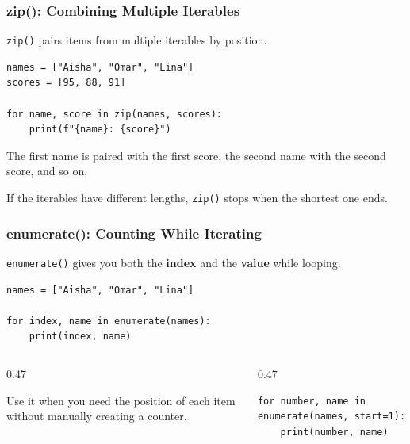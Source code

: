 \documentclass[aspectratio=169,10pt]{beamer}
\newcommand{\keyword}[1]{\textcolor{PrimaryBlue}{\textbf{#1}}}
\newcommand{\codeword}[1]{\texttt{#1}}
\begin{document}
\begin{frame}[fragile]
\frametitle{zip(): Combining Multiple Iterables}
\small
\codeword{zip()} pairs items from multiple iterables by position.

\vspace{0.18cm}
\begin{lstlisting}[style=pycode]
names = ["Aisha", "Omar", "Lina"]
scores = [95, 88, 91]

for name, score in zip(names, scores):
    print(f"{name}: {score}")
\end{lstlisting}

\begin{tcolorbox}[lecturebox,title=What happens?]
The first name is paired with the first score, the second name with the second score, and so on.
\end{tcolorbox}

\vspace{0.10cm}
\begin{tcolorbox}[lecturebox,title=Careful]
If the iterables have different lengths, \codeword{zip()} stops when the shortest one ends.
\end{tcolorbox}
\end{frame}

\begin{frame}[fragile]
\frametitle{enumerate(): Counting While Iterating}
\small
\codeword{enumerate()} gives you both the \keyword{index} and the \keyword{value} while looping.

\vspace{0.18cm}
\begin{lstlisting}[style=pycode]
names = ["Aisha", "Omar", "Lina"]

for index, name in enumerate(names):
    print(index, name)
\end{lstlisting}

\begin{columns}[T,totalwidth=0.96\textwidth]
\begin{column}{0.47\textwidth}
\begin{tcolorbox}[lecturebox,title=Why use it?]
Use it when you need the position of each item without manually creating a counter.
\end{tcolorbox}
\end{column}
\begin{column}{0.47\textwidth}
\begin{tcolorbox}[lecturebox,title=Custom start]
\begin{lstlisting}[style=pycodesmall]
for number, name in enumerate(names, start=1):
    print(number, name)
\end{lstlisting}
\end{tcolorbox}
\end{column}
\end{columns}
\end{frame}
\end{document}
